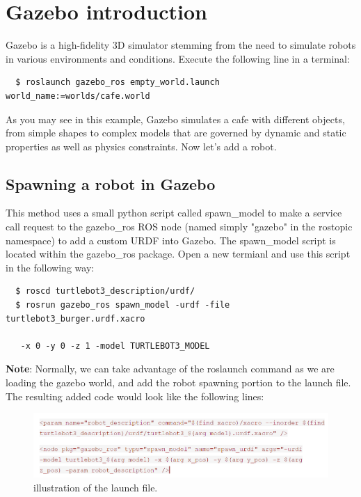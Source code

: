 \documentclass[12pt]{article}
\begin{document}
	\MakeScribeTop

 

\section {Gazebo introduction}
Gazebo is a high-fidelity 3D simulator stemming from the need to
simulate robots in various environments and conditions.
Execute the following line in a terminal:

\begin{verbatim}
  $ roslaunch gazebo_ros empty_world.launch world_name:=worlds/cafe.world
\end{verbatim}

As you may see in this example, Gazebo simulates a cafe with different objects, from simple shapes to complex models that are governed by dynamic and static properties as well as physics constraints. Now let’s add a robot. 

\subsection{Spawning a robot in Gazebo}

This method uses a small python script called spawn\_model to make a service call request to the gazebo\_ros ROS node (named simply "gazebo" in the rostopic namespace) to add a custom URDF into Gazebo. The spawn\_model script is located within the gazebo\_ros package. Open a new termianl and use this script in the following way:
\begin{verbatim}
  $ roscd turtlebot3_description/urdf/
  $ rosrun gazebo_ros spawn_model -urdf -file turtlebot3_burger.urdf.xacro
  
   -x 0 -y 0 -z 1 -model TURTLEBOT3_MODEL 
\end{verbatim}

\textbf{Note}: Normally, we can take advantage of the roslaunch command as we are loading the gazebo world, and add the robot spawning portion to the launch file. The resulting added code would look like the following lines:
\begin{figure}[H]
  \vspace{-10pt}
  \centering\includegraphics[width=14cm]{lab1figure/lab1gazebo.png}\vspace{-10pt}
  \caption{illustration of the launch file.}\label{fig:omni}
  \end{figure}
\end{document}
